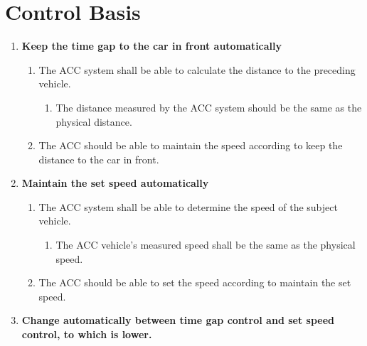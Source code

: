 \section{Control Basis}

	\begin{enumerate}
		\item {\bf Keep the time gap to the car in front automatically}
			\begin{enumerate}[label*=\arabic*.]
				\item The ACC system shall be able to calculate the distance to 
				the preceding vehicle.
					\begin{enumerate}[label*=\arabic*.]
						\item The distance measured by the ACC system should be the same 
						as the physical distance.
					\end{enumerate}
				\item The ACC should be able to maintain the speed according to keep the
				distance to the car in front.
			\end{enumerate}
		\item {\bf Maintain the set speed automatically}
			\begin{enumerate}[label*=\arabic*.]
				\item The ACC system shall be able to determine the speed of the
				subject vehicle.
					\begin{enumerate}[label*=\arabic*.]
						\item The ACC vehicle’s measured speed shall be the same
						as the physical speed.
					\end{enumerate}
				\item The ACC should be able to set the speed according to maintain the 
				set speed.
			\end{enumerate}
		\item {\bf Change automatically between time gap control and set speed control, 
		to which is lower.}
	\end{enumerate}

\clearpage

